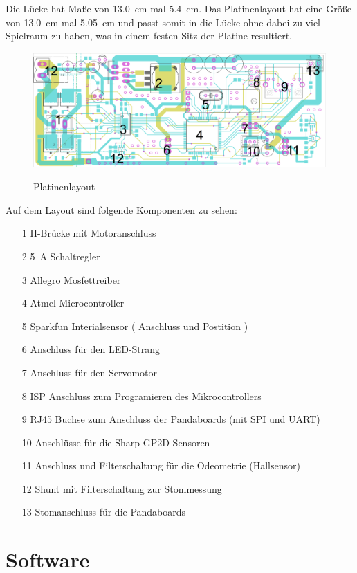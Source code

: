 Die Lücke hat Maße von \SI{13,0}{\cm} mal \SI{5,4}{\cm}. Das Platinenlayout hat eine Größe von  \SI{13,0}{\cm} mal \SI{5,05}{\cm} und passt somit in die Lücke ohne dabei zu viel Spielraum zu haben, 
was in einem festen Sitz der Platine resultiert. 

\begin{figure}[H]
\centering
\includegraphics[width=.8\textwidth]{platinen_layout_scr.png}\\
\caption{Platinenlayout}%
\label{fig:layout}
\end{figure}


Auf dem Layout sind folgende Komponenten zu sehen:
\begin{itemize}
\setlength{\parskip}{0pt}
 \item [1] H-Brücke mit Motoranschluss
 \item [2] \SI{5}{\A} Schaltregler
 \item [3] Allegro Mosfettreiber
 \item [4] Atmel Microcontroller
 \item [5] Sparkfun Interialsensor ( Anschluss und Postition )
 \item [6] Anschluss für den LED-Strang
 \item [7] Anschluss für den Servomotor
 \item [8] ISP Anschluss zum Programieren des Mikrocontrollers
 \item [9] RJ45 Buchse zum Anschluss der Pandaboards (mit SPI und UART)
 \item [10] Anschlüsse für die Sharp GP2D Sensoren 
 \item [11] Anschluss und Filterschaltung für die Odeometrie (Hallsensor)
 \item [12] Shunt mit Filterschaltung zur Stommessung
 \item [13] Stomanschluss für die Pandaboards
\end{itemize}



\section{Software}

